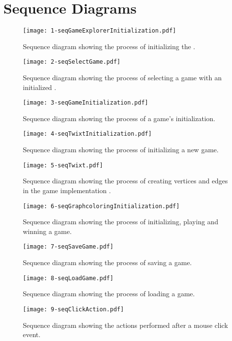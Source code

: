 \section{Sequence Diagrams}

\begin{figure}[h]
	\centering
	\texttt{[image: 1-seqGameExplorerInitialization.pdf]}
	\caption{Sequence diagram showing the process of initializing the \gameexplorer.}
	\label{img:seqGameExplorerInitialization}
\end{figure}

\begin{figure}[h]
	\centering
	\texttt{[image: 2-seqSelectGame.pdf]}
	\caption{Sequence diagram showing the process of selecting a game with an initialized \gameexplorer.}
	\label{img:seqSelectGame}
\end{figure}

\begin{figure}[h]
	\centering
	\texttt{[image: 3-seqGameInitialization.pdf]}
	\caption{Sequence diagram showing the process of a game's initialization.}
	\label{img:seqGameInitialization}
\end{figure}

\begin{figure}[h]
	\centering
	\texttt{[image: 4-seqTwixtInitialization.pdf]}
	\caption{Sequence diagram showing the process of initializing a new \twixt game.}
	\label{img:seqTwixtInitialization}
\end{figure}

\begin{figure}[h]
	\centering
	\texttt{[image: 5-seqTwixt.pdf]}
	\caption{Sequence diagram showing the process of creating vertices and edges in the game implementation \twixt.}
	\label{img:seqTwixt}
\end{figure}

\begin{figure}[h]
	\centering
	\texttt{[image: 6-seqGraphcoloringInitialization.pdf]}
	\caption{Sequence diagram showing the process of initializing, playing and winning a \graphcoloring game.}
	\label{img:seqGraphcoloringInitialization}
\end{figure}

\begin{figure}[h]
	\centering
	\texttt{[image: 7-seqSaveGame.pdf]}
	\caption{Sequence diagram showing the process of saving a game.}
	\label{img:seqSaveGame}
\end{figure}

\begin{figure}[h]
	\centering
	\texttt{[image: 8-seqLoadGame.pdf]}
	\caption{Sequence diagram showing the process of loading a game.}
	\label{img:seqLoadGame}
\end{figure}

\begin{figure}[h]
	\centering
	\texttt{[image: 9-seqClickAction.pdf]}
	\caption{Sequence diagram showing the actions performed after a mouse click event.}
	\label{img:seqClickAction}
\end{figure}